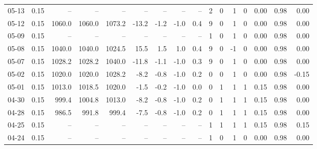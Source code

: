 \begin{threeparttable}
{\begin{tabular}{lrrrrrrrrrrrrrrr}
  05-13 &     0.15 &     -- &     -- &     -- &         -- &             -- &                       -- &                  -- &              2 &         0 &     1 &         0 &       0.00 &      0.98 &           0.00 \\
  05-12 &     0.15 & 1060.0 & 1060.0 & 1073.2 &      -13.2 &           -1.2 &                     -1.0 &                 0.4 &              9 &         0 &     1 &         0 &       0.00 &      0.98 &           0.00 \\
  05-09 &     0.15 &     -- &     -- &     -- &         -- &             -- &                       -- &                  -- &              1 &         0 &     1 &         0 &       0.00 &      0.98 &           0.00 \\
  05-08 &     0.15 & 1040.0 & 1040.0 & 1024.5 &       15.5 &            1.5 &                      1.0 &                 0.4 &              9 &         0 &    -1 &         0 &       0.00 &      0.98 &           0.00 \\
  05-07 &     0.15 & 1028.2 & 1028.2 & 1040.0 &      -11.8 &           -1.1 &                     -1.0 &                 0.3 &              9 &         0 &     1 &         0 &       0.00 &      0.98 &           0.00 \\
  05-02 &     0.15 & 1020.0 & 1020.0 & 1028.2 &       -8.2 &           -0.8 &                     -1.0 &                 0.2 &              0 &         0 &     1 &         0 &       0.00 &      0.98 &          -0.15 \\
  05-01 &     0.15 & 1013.0 & 1018.5 & 1020.0 &       -1.5 &           -0.2 &                     -1.0 &                 0.0 &              0 &         1 &     1 &         1 &       0.15 &      0.98 &           0.00 \\
  04-30 &     0.15 &  999.4 & 1004.8 & 1013.0 &       -8.2 &           -0.8 &                     -1.0 &                 0.2 &              0 &         1 &     1 &         1 &       0.15 &      0.98 &           0.00 \\
  04-28 &     0.15 &  986.5 &  991.8 &  999.4 &       -7.5 &           -0.8 &                     -1.0 &                 0.2 &              0 &         1 &     1 &         1 &       0.15 &      0.98 &           0.00 \\
  04-25 &     0.15 &     -- &     -- &     -- &         -- &             -- &                       -- &                  -- &              1 &         1 &     1 &         1 &       0.15 &      0.98 &           0.15 \\
  04-24 &     0.15 &     -- &     -- &     -- &         -- &             -- &                       -- &                  -- &              1 &         0 &     1 &         0 &       0.00 &      0.98 &           0.00 \\

\end{tabular}}
\end{threeparttable}
